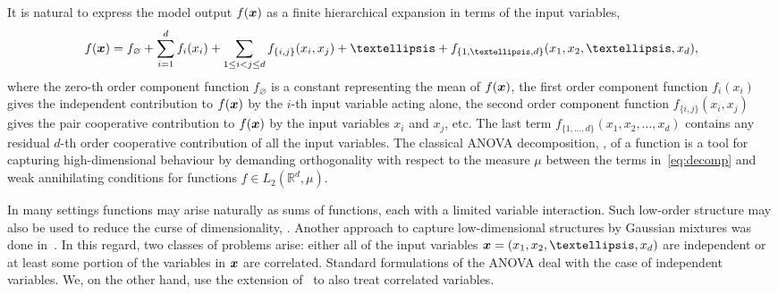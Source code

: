 \documentclass{article}
\renewcommand{\vec}[1]{\ensuremath \mathbf{\boldsymbol{#1}}}
\newcommand{\x}{\ensuremath{\vec x}}
\newcommand{\R}{\ensuremath{\mathbb{R}}}
\theoremstyle{definition}
\numberwithin{equation}{section}
\begin{document}
It is natural to express the model output $f(\x)$ as a finite hierarchical expansion in terms of the input variables,
\begin{equation}\label{eq:decomp}
f(\x) = f_{\varnothing} + \sum_{i=1}^d f_i(x_i) + \sum_{1\leq i<j\leq d} f_{\{i,j\}} (x_i,x_j)+\ldots + f_{\{1,\ldots,d\}}(x_1,x_2,\ldots, x_d), 
\end{equation}
where the zero-th order component function $f_\varnothing$ is a constant representing the mean
of $f (\x)$, the first order component function $f_i (x_i )$ gives the independent
contribution to $f (\x)$ by the $i$-th input variable acting alone, the second order component
function $ f_{\{i,j\}} (x_i,x_j)$ gives the pair cooperative contribution to $f (\x)$ by the input
variables $x_i$ and $x_j$, etc. The last term $f_{\{1,\ldots,d\}}(x_1,x_2,\ldots, x_d)$ contains any residual
$d$-th order cooperative contribution of all the input variables. The classical ANOVA decomposition, \cite{CaMoOw97, LiOw06,Holtz11}, of a function is a tool for capturing high-dimensional behaviour by demanding orthogonality with respect to the measure $\mu$ between the terms in~\eqref{eq:decomp} and weak annihilating conditions for functions $f\in L_2(\R^d,\mu)$. \par

In many settings functions may arise naturally as sums of functions, each with a limited variable interaction. Such
low-order structure may also be used to reduce the curse of dimensionality, \cite{CaMoOw97, Wu2011, SchmischkeDiss}. Another approach to capture low-dimensional structures by Gaussian mixtures was done in~\cite{HeBaSt22}.
In this regard, two classes of problems arise: either all of the
input variables $\x = (x_1, x_2,\ldots, x_d)$ are independent or at least some portion of the
variables in $\x$ are correlated. Standard formulations of the ANOVA deal with the case
of independent variables. We, on the other hand, use the extension of~\cite{LiRa12} to also treat correlated
variables.\par
\end{document}
